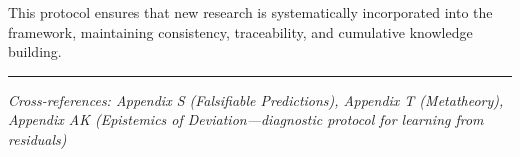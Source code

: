 This protocol ensures that new research is systematically incorporated into the
framework, maintaining consistency, traceability, and cumulative knowledge building.

\vspace{1em}
\hrule
\vspace{0.5em}
\noindent\textit{Cross-references: Appendix S (Falsifiable Predictions), 
Appendix T (Metatheory), Appendix AK (Epistemics of Deviation---diagnostic 
protocol for learning from residuals)}
